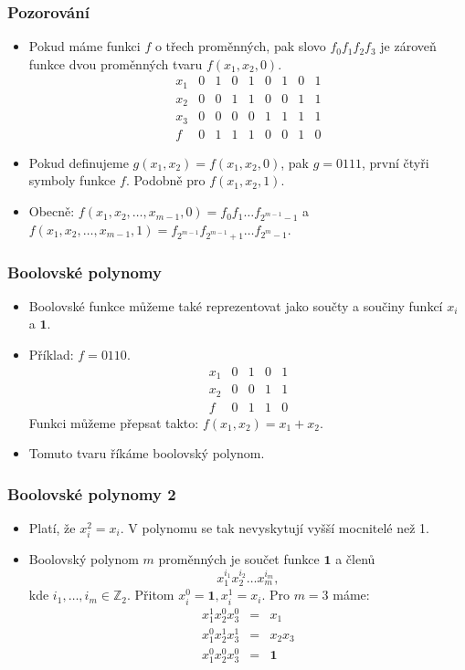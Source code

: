 \documentclass{beamer}
\newcommand{\cela}{\mathbb{Z}}
\newcommand{\one}{\textbf{1}}
\newenvironment{itemizex}%
  {\large \begin{itemize}%
    \setlength{\itemsep}{8pt}%
    \setlength{\parskip}{8pt}}%
  {\end{itemize}}
\begin{document}
\begin{frame}[t,fragile]\frametitle{Pozorování} 
    \begin{itemizex}
        \item Pokud máme funkci $f$ o třech proměnných, pak slovo $f_0f_1f_2f_3$ je zároveň funkce dvou proměnných tvaru $f(x_1, x_2, 0)$.
$$
\begin{array}{l|cccccccc}
x_1&0&1&0&1&0&1&0&1\\
x_2&0&0&1&1&0&0&1&1\\
x_3&0&0&0&0&1&1&1&1\\\hline
f&0&1&1&1&0&0&1&0
\end{array}
$$
        \item Pokud definujeme $g(x_1, x_2)=f(x_1, x_2, 0)$, pak $g=0111$, první čtyři symboly funkce $f$. Podobně pro $f(x_1, x_2, 1)$.
        \item Obecně: $f(x_1, x_2, \dots, x_{m-1}, 0)=f_0f_1\dots f_{2^{m-1}-1}$ a $f(x_1, x_2, \dots, x_{m-1}, 1)=f_{2^{m-1}}f_{2^{m-1}+1}\dots f_{2^{m}-1}$.
    \end{itemizex}
\end{frame}



\begin{frame}[t,fragile]\frametitle{Boolovské polynomy} 
    \begin{itemizex}
        \item Boolovské funkce můžeme také reprezentovat jako součty a součiny funkcí $x_i$ a $\one$.
        \item Příklad: $f=0110$. 
$$
\begin{array}{l|cccc}
x_1&0&1&0&1\\
x_2&0&0&1&1\\\hline
f&0&1&1&0
\end{array}
$$
        Funkci můžeme přepsat takto: $f(x_1, x_2)=x_1+x_2$.
        \item Tomuto tvaru říkáme boolovský polynom.
    \end{itemizex}
\end{frame}


\begin{frame}[t,fragile]\frametitle{Boolovské polynomy 2} 
  \begin{itemizex}
    \item Platí, že $x_i^2=x_i$. V polynomu se tak nevyskytují vyšší mocnitelé než 1.
    \item Boolovský polynom $m$ proměnných je součet funkce $\one$ a členů
    $$
    x_1^{i_1} x_2^{i_2}\dots x_m^{i_m},
    $$
    kde $i_1, \dots, i_m\in\cela_2$. Přitom $x_i^0=\one, x_i^1=x_i$. Pro $m=3$ máme:
    \begin{eqnarray*}
  x_1^1x_2^0x_3^0&=& x_1\\
  x_1^0x_2^1x_3^1&=& x_2x_3\\
  x_1^0x_2^0x_3^0&=& \one\\
    \end{eqnarray*}
  \end{itemizex}
\end{frame}
\end{document}
